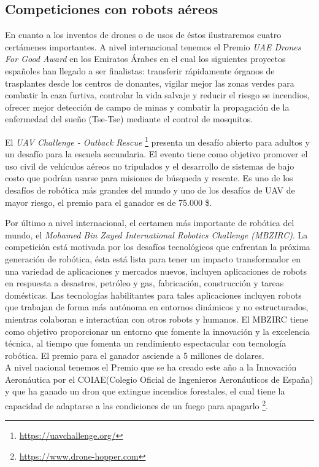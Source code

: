 \subsection{Competiciones con robots aéreos}
\hspace{1cm} En cuanto a los inventos de drones o de usos de éstos ilustraremos cuatro certámenes importantes. A nivel internacional tenemos el Premio \textit{UAE Drones For Good Award} en los Emiratos Árabes en el cual los siguientes proyectos españoles han llegado a ser finalistas: transferir rápidamente órganos de trasplantes desde los centros de donantes, vigilar mejor las zonas verdes para combatir la caza furtiva, controlar la vida salvaje y reducir el riesgo se incendios, ofrecer mejor detección de campo de minas y combatir la propagación de la enfermedad del sueño (Tse-Tse) mediante el control de mosquitos.

\hspace{1cm} El \textit{UAV Challenge - Outback Rescue} \footnote{\url{https://uavchallenge.org/}} presenta un desafío abierto para adultos y un desafío para la escuela secundaria. El evento tiene como objetivo promover el uso civil de vehículos aéreos no tripulados y el desarrollo de sistemas de bajo costo que podrían usarse para misiones de búsqueda y rescate. Es uno de los desafíos de robótica más grandes del mundo y uno de los desafíos de UAV de mayor riesgo, el premio para el ganador es de 75.000 \$.

\hspace{1cm} Por último a nivel internacional, el certamen más importante de robótica del mundo, el \textit{Mohamed Bin Zayed International Robotics Challenge (MBZIRC)}. La competición está motivada por los desafíos tecnológicos que enfrentan la próxima generación de robótica, ésta está lista para tener un impacto transformador en una variedad de aplicaciones y mercados nuevos, incluyen aplicaciones de robots en respuesta a desastres, petróleo y gas, fabricación, construcción y tareas domésticas. Las tecnologías habilitantes para tales aplicaciones incluyen robots que trabajan de forma más autónoma en entornos dinámicos y no estructurados, mientras colaboran e interactúan con otros robots y humanos. El MBZIRC tiene como objetivo proporcionar un entorno que fomente la innovación y la excelencia técnica, al tiempo que fomenta un rendimiento espectacular con tecnología robótica. El premio para el ganador asciende a 5 millones de dolares.
\\

\hspace{1cm} A nivel nacional tenemos el Premio que se ha creado este año a la Innovación Aeronáutica por el COIAE(Colegio Oficial de Ingenieros Aeronáuticos de España) y que ha ganado un dron que extingue incendios forestales, el cual tiene la capacidad de adaptarse a las condiciones de un fuego para apagarlo \footnote{\url{https://www.drone-hopper.com}}.
\\


